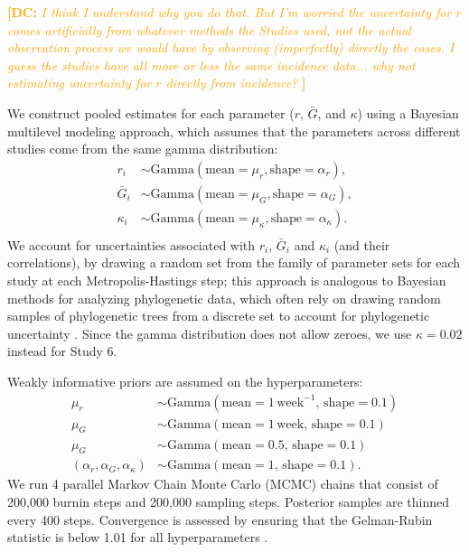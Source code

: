 \documentclass[12pt]{article}
\newcommand{\comment}[3]{\textcolor{#1}{\textbf{[#2: }\textsl{#3}\textbf{]}}}
\newcommand{\dc}[1]{\comment{Orange}{DC}{#1}}
\begin{document}
\dc{I think I understand why you do that. But I'm worried the uncertainty for $r$ comes artificially from whatever methods the Studies used, not the actual observation process we would have by observing (imperfectly) directly the cases. 
I guess the studies have all more or less the same incidence data... why not estimating uncertainty for $r$ directly from incidence? }

We construct pooled estimates for each parameter ($r$, $\bar G$, and $\kappa$) using a Bayesian multilevel modeling approach, which assumes that the parameters across different studies come from the same gamma distribution:
\begin{equation}
\begin{aligned}
r_i &\sim \mathrm{Gamma}(\mathrm{mean}=\mu_r, \mathrm{shape}=\alpha_r),\\
\bar{G}_i &\sim \mathrm{Gamma}(\mathrm{mean}=\mu_G, \mathrm{shape}=\alpha_G),\\
\kappa_i &\sim \mathrm{Gamma}(\mathrm{mean}=\mu_\kappa, \mathrm{shape}=\alpha_\kappa).\\
\end{aligned}
\end{equation}
We account for uncertainties associated with $r_i$, $\bar G_i$ and $\kappa_i$ (and their correlations), by drawing a random set from the family of parameter sets for each study at each Metropolis-Hastings step;
this approach is analogous to Bayesian methods for analyzing phylogenetic data, which often rely on drawing random samples of phylogenetic trees from a discrete set to account for phylogenetic uncertainty \citep{pagel2004bayesian,bedford2014integrating}.
Since the gamma distribution does not allow zeroes, we use $\kappa =0.02$ instead for Study 6.

Weakly informative priors are assumed on the hyperparameters:
\begin{equation}
\begin{aligned}
\mu_r &\sim \mathrm{Gamma}(\mathrm{mean}=1\,\mathrm{week}^{-1},\,\mathrm{shape}=0.1)\\
\mu_G &\sim \mathrm{Gamma}(\mathrm{mean}=1\,\mathrm{week},\,\mathrm{shape}=0.1)\\
\mu_G &\sim \mathrm{Gamma}(\mathrm{mean}=0.5,\,\mathrm{shape}=0.1)\\
(\alpha_r, \alpha_G, \alpha_\kappa) &\sim \mathrm{Gamma}(\mathrm{mean}=1,\,\mathrm{shape}=0.1).
\end{aligned}
\end{equation}
We run 4 parallel Markov Chain Monte Carlo (MCMC) chains that consist of 200,000 burnin steps and 200,000 sampling steps.
Posterior samples are thinned every 400 steps.
Convergence is assessed by ensuring that the Gelman-Rubin statistic is below 1.01 for all hyperparameters \citep{gelman1992inference}.

\pagebreak


\end{document}
